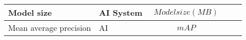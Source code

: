 \begin{table}[h!]
\begin{tabular}{|p{2cm}|l|p{6cm}|p{3cm}|p{1.5cm}|}
Model size
& AI System
& 
\parbox{3cm}{
    \begin{equation} \label{equ:mz} 
    \begin{split}
Model size (MB)
    \end{split} 
    \end{equation} 
}
& 
&      
\\ \hline

Mean average precision
& AI 
& 
\parbox{3cm}{
    \begin{equation} \label{equ:map} 
    \begin{split}
mAP
    \end{split} 
    \end{equation} 
}
& 
&      
\\ \hline
\end{tabular}
\end{table}


